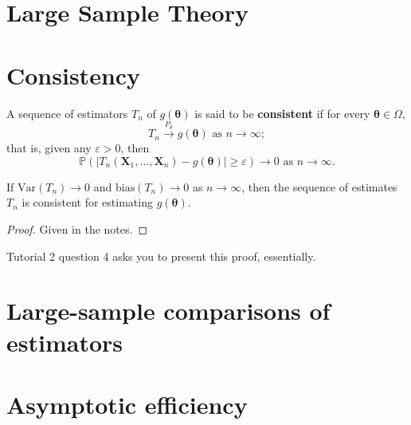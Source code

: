 \section{Large Sample Theory}\label{sec:large sample theory}


\section{Consistency}\label{sec:consistency}

\begin{definition}[Consistent]\label{defn:consistent}
    A sequence of estimators \(T_n\) of \(g(\bm{\theta})\) is said to be \textbf{consistent} if for every \(\bm{\theta}\in\Omega\), 
    \begin{equation*}
        T_n \overset{P_\theta}{\to} g(\bm{\theta})\text{ as } n\to\infty;
    \end{equation*}
    that is, given any \(\varepsilon>0\), then 
    \begin{equation*}
        \mathbb{P}\left(|T_n(\bm{X}_1,...,\bm{X}_n) - g(\bm{\theta})| \geq \varepsilon \right) \to 0\text{ as } n\to\infty.
    \end{equation*}
\end{definition}

\begin{theorem}[Consistent]\label{thm:consistent}
    If \(\text{Var}(T_n)\to 0\) and \(\text{bias}(T_n)\to 0\) as \(n\to\infty\), then the sequence of estimates \(T_n\) is consistent for estimating \(g(\bm{\theta})\). 
\end{theorem}

\begin{proof}
    Given in the notes.
\end{proof}

\begin{exercise}
    Tutorial 2 question 4 asks you to present this proof, essentially. 
\end{exercise}


\section{Large-sample comparisons of estimators}\label{sec:large-sample comps}


\section{Asymptotic efficiency}\label{sec:asymptotic efficiency}



